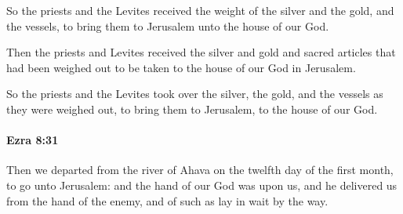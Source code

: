 			\begin{versebox}
					\item[BHS] 
					\item[LXX] 
					\item[ASV] So the priests and the Levites received the weight of the silver and the gold, and the vessels, to bring them to Jerusalem unto the house of our God.
					\item[NIV] Then the priests and Levites received the silver and gold and sacred articles that had been weighed out to be taken to the house of our God in Jerusalem.
					\item[NRSV] So the priests and the Levites took over the silver, the gold, and the vessels as they were weighed out, to bring them to Jerusalem, to the house of our God.
			\end{versebox}

		\paragraph{Ezra 8:31} %
			\label{EZRA-8-31}

			Then we departed from the river of Ahava on the twelfth day of the first month, to go unto Jerusalem: and the hand of our God was upon us, and he delivered us from the hand of the enemy, and of such as lay in wait by the way.

